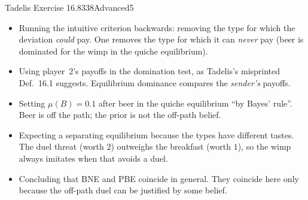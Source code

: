 \begin{exsol}{Tadelis Exercise 16.8}{338}{Advanced}{5}
\mistakes
\begin{itemize}
  \item Running the intuitive criterion backwards: removing the type for which the deviation \emph{could} pay.
  One removes the type for which it can \emph{never} pay (beer is dominated for the wimp in the quiche equilibrium).
  \item Using player~2's payoffs in the domination test, as Tadelis's misprinted Def.~16.1 suggests. Equilibrium
  dominance compares the \emph{sender's} payoffs.
  \item Setting $\mu(B) = 0.1$ after beer in the quiche equilibrium ``by Bayes' rule''. Beer is off the path; the
  prior is not the off-path belief.
  \item Expecting a separating equilibrium because the types have different tastes. The duel threat (worth $2$)
  outweighs the breakfast (worth $1$), so the wimp always imitates when that avoids a duel.
  \item Concluding that BNE and PBE coincide in general. They coincide here only because the off-path duel can
  be justified by some belief.
\end{itemize}

\end{exsol}

